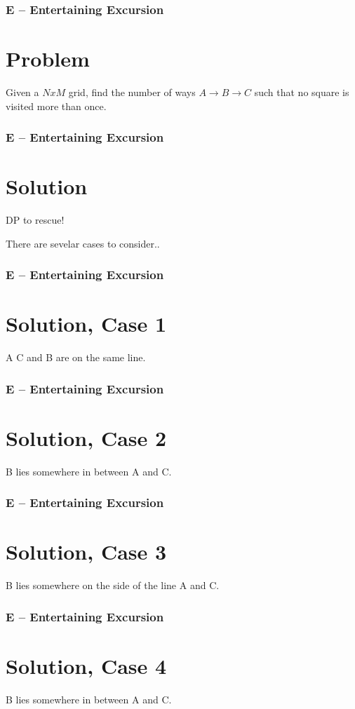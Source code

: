\begin{frame}
  \frametitle{E -- Entertaining Excursion}
  \section*{Problem}
  Given a $NxM$ grid, find the number of ways $A \rightarrow B \rightarrow C$ such that no square is visited more than once.
\end{frame}
\begin{frame}
  \frametitle{E -- Entertaining Excursion}
  \section*{Solution}
  DP to rescue!

  There are sevelar cases to consider..
\end{frame}
\begin{frame}
  \frametitle{E -- Entertaining Excursion}
  \section*{Solution, Case 1}

  A C and B are on the same line.
\end{frame}
\begin{frame}
  \frametitle{E -- Entertaining Excursion}
  \section*{Solution, Case 2}

  B lies somewhere in between A and C.
\end{frame}
\begin{frame}
  \frametitle{E -- Entertaining Excursion}
  \section*{Solution, Case 3}

  B lies somewhere on the side of the line A and C.
\end{frame}
\begin{frame}
  \frametitle{E -- Entertaining Excursion}
  \section*{Solution, Case 4}

  B lies somewhere in between A and C.
\end{frame}
